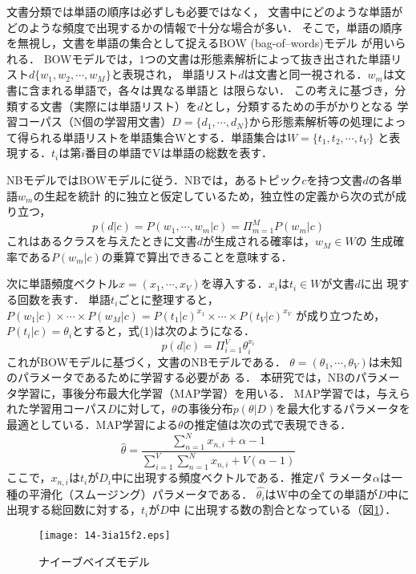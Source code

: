 \documentclass[japanese]{jnlp_1.3c}
\begin{document}
文書分類では単語の順序は必ずしも必要ではなく，
文書中にどのような単語がどのような頻度で出現するかの情報で十分な場合が多い．
そこで，単語の順序を無視し，文書を単語の集合として捉えるBOW (bag-of--words)モデル
が用いられる．
BOWモデルでは，1つの文書は形態素解析によって抜き出された単語リスト$d\{w_1,w_2,\cdots,w_M\}$と表現され，
単語リスト$d$は文書と同一視される．$w_m$は文書に含まれる単語で，各々は異なる単語と
は限らない．
この考えに基づき，分類する文書（実際には単語リスト）を$d$とし，分類するための手がかりとなる
学習コーパス（N個の学習用文書）$D=\{d_1,\cdots,d_N\}$から形態素解析等の処理によって得られる単語リストを単語集合Wとする．単語集合は$W=\{t_1,t_2,\cdots,t_V\}$
と表現する．$t_i$は第$i$番目の単語でVは単語の総数を表す．

NBモデルではBOWモデルに従う．NBでは，あるトピック$c$を持つ文書$d$の各単語$w_m$の生起を統計
的に独立と仮定しているため，独立性の定義から次の式が成り立つ，
\begin{equation}
p(d|c)=P(w_1,\cdots,w_m|c)=\Pi_{m=1}^MP(w_m|c)
\end{equation}
これはあるクラスを与えたときに文書$d$が生成される確率は，$w_M\in W$の
生成確率である$P(w_m|c)$の乗算で算出できることを意味する．


次に単語頻度ベクトル$x=(x_1,\cdots,x_V)$を導入する．$x_i$は$t_i\in W$が文書$d$に出
現する回数を表す．
単語$t_i$ごとに整理すると，$P(w_1|c)\times \cdots \times P(w_M|c)=P(t_1|c)^{x_1}\times \cdots \times P(t_V|c)^{x_V}$
が成り立つため，$P(t_i|c)=\theta_iとすると，$式(1)は次のようになる．
\begin{equation}
p(d|c)=\Pi_{i=1}^V\theta_i^{x_i}
\end{equation}
これがBOWモデルに基づく，文書のNBモデルである．
$\theta=(\theta_1,\cdots,\theta_V)$は未知のパラメータであるために学習する必要があ
る．
本研究では，NBのパラメータ学習に，事後分布最大化学習（MAP学習）を用いる．
MAP学習では，与えられた学習用コーパス$D$に対して，$\theta$の事後分布$p(\theta|D)$を最大化するパラメータを最適としている．MAP学習による$\theta$の推定値は次の式で表現できる．
\begin{equation}
\hat{\theta}=\frac{\sum_{n=1}^Nx_{n,i}+\alpha-1}{\sum_{i=1}^V\sum_{n=1}^N x_{n,i}+V(\alpha -1)}
\end{equation}
ここで，$x_{n,i}$は$t_i$が$D_i$中に出現する頻度ベクトルである．推定パ
ラメータ$\alpha$は一種の平滑化（スムージング）パラメータである．
$\hat{\theta_i}$はW中の全ての単語が$D$中に出現する総回数に対する，$t_i$が$D$中
に出現する数の割合となっている（図\ref{fig:3.2}）．

\begin{figure}[t]
 \begin{center}
      \texttt{[image: 14-3ia15f2.eps]}
  \caption{ナイーブベイズモデル}
  \label{fig:3.2}
 \end{center}
\end{figure}
\end{document}
